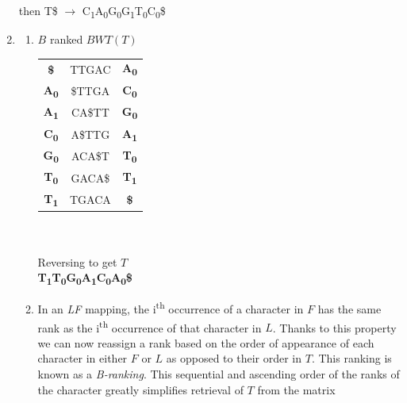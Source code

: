 \documentclass[12pt]{article}
\begin{document}
\begin{enumerate}
then T\$ $\rightarrow$ C\textsubscript{1}A\textsubscript{0}G\textsubscript{0}G\textsubscript{1}T\textsubscript{0}C\textsubscript{0}\$
\item
    \begin{enumerate}
        \item $B$ ranked $BWT(T)$ \\
        \begin{tabular}{ |c|c|c| } 
            \hline
            \textbf{\$} & TTGAC & \textbf{A\textsubscript{0}}\\
            \textbf{A\textsubscript{0}} & \$TTGA & \textbf{C\textsubscript{0}}\\
            \textbf{A\textsubscript{1}} & CA\$TT & \textbf{G\textsubscript{0}}\\
            \textbf{C\textsubscript{0}} & A\$TTG & \textbf{A\textsubscript{1}}\\
            \textbf{G\textsubscript{0}} & ACA\$T & \textbf{T\textsubscript{0}}\\
            \textbf{T\textsubscript{0}} & GACA\$ & \textbf{T\textsubscript{1}}\\
            \textbf{T\textsubscript{1}} & TGACA & \textbf{\$}\\
            \hline
           \end{tabular} \\ \\
        Reversing to get $T$  \\
        \textbf{T\textsubscript{1}T\textsubscript{0}G\textsubscript{0}A\textsubscript{1}C\textsubscript{0}A\textsubscript{0}\$} \\
        
        \item In an \textit{LF} mapping, the i\textsuperscript{th} occurrence of a character in $F$ has the same rank 
        as the i\textsuperscript{th} occurrence of that character in $L$. Thanks to this property we can now reassign a rank based
        on the order of appearance of each character in either $F$ or $L$ as opposed to their order in $T$. This ranking is known
        as a \textit{B-ranking}. This sequential and ascending order of the ranks of the character greatly simplifies retrieval 
        of $T$ from the matrix
    \end{enumerate}

\end{enumerate}



\end{document}
